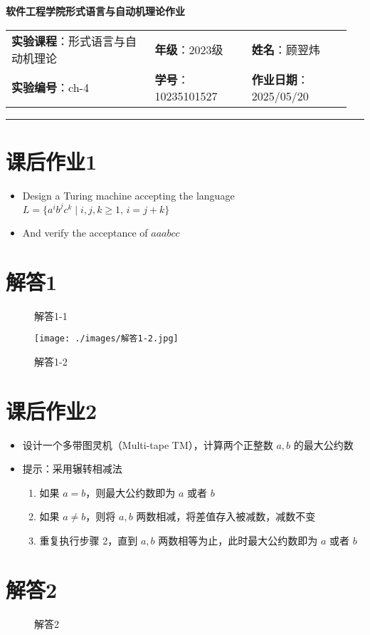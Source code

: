 \documentclass{article}
\begin{document}
	
	\begin{center}
		{\Large{\textbf{\heiti 软件工程学院形式语言与自动机理论作业}}}
		\begin{table}[htb]
			\flushleft
			\begin{tabular}{p{0.4\linewidth}p{0.27\linewidth}p{0.28\linewidth}}\\
				\textbf{实验课程}：形式语言与自动机理论  & \textbf{年级}：2023级       & \textbf{姓名}：顾翌炜  \\
				\textbf{实验编号}：ch-4    & \textbf{学号}：10235101527 & \textbf{作业日期}：2025/05/20  \\
			\end{tabular}
		\end{table}
	\end{center}
	\rule{\textwidth}{2pt}
	
	\section*{课后作业1}
	
	\begin{itemize}
		\item Design a Turing machine accepting the language
		$
		L = \{a^i b^j c^k \mid i, j, k \geq 1, \, i = j + k\}
		$
		\item And verify the acceptance of $ aaabcc $
	\end{itemize}
	
	\section*{解答1}
	
	\begin{figure}[H]
		\centering
		\caption{解答1-1}
	\end{figure}
	
	\begin{figure}[H]
		\centering
		\texttt{[image: ./images/解答1-2.jpg]}
		\caption{解答1-2}
	\end{figure}
	
	\section*{课后作业2}
	
	\begin{itemize}
		\item 设计一个多带图灵机（Multi-tape TM），计算两个正整数 \(a, b\) 的最大公约数
		\item 提示：采用辗转相减法
		\begin{enumerate}
			\item 如果 \(a = b\)，则最大公约数即为 \(a\) 或者 \(b\)
			\item 如果 \(a \neq b\)，则将 \(a, b\) 两数相减，将差值存入被减数，减数不变
			\item 重复执行步骤 2，直到 \(a, b\) 两数相等为止，此时最大公约数即为 \(a\) 或者 \(b\)
		\end{enumerate}
	\end{itemize}
	
	\section*{解答2}
	
	\begin{figure}[H]
		\centering
		\caption{解答2}
	\end{figure}
\end{document}
